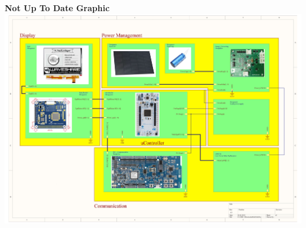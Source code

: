

\textbf{Not Up To Date Graphic}\\

\includegraphics[scale=0.5]{4-development/overview/graphics/Blockschaltbild.pdf}
